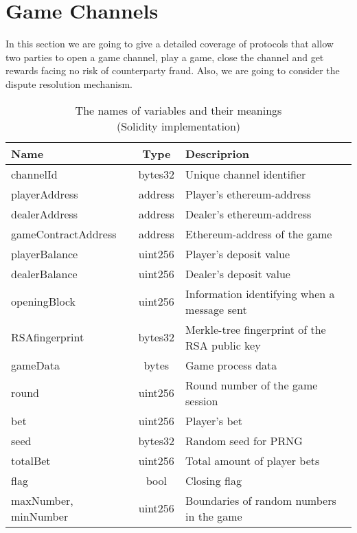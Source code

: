 \section{Game Channels} \label{gamechannel}
In this section we are going to give a detailed coverage of protocols that allow two parties to open a game channel, play a game, close the channel and get rewards facing no risk of counterparty fraud. Also, we are going to consider the dispute resolution mechanism.

\begin{table}[h]

\caption{The names of variables and their meanings \\ (Solidity implementation)}
\begin{tabular}{|l|c|l|}
\hline
Name&Type&Descriprion\\
\hline
channelId & bytes32 & Unique channel identifier\\ 

playerAddress & address & Player's ethereum-address\\            
dealerAddress & address & Dealer's ethereum-address\\  
gameContractAddress & address & Ethereum-address of the game\\             
playerBalance & uint256 & Player's deposit value\\                   
dealerBalance & uint256 & Dealer's deposit value\\                   
openingBlock & uint256 &  Information identifying when a message sent\\                  
RSAfingerprint & bytes32 &  Merkle-tree fingerprint of the RSA public key\\  
gameData & bytes & Game process data\\
round & uint256 & Round number of the game session \\
bet & uint256 & Player's bet \\
seed & bytes32 & Random seed for PRNG\\
totalBet & uint256 & Total amount of  player bets \\
flag & bool &Closing flag \\
maxNumber, minNumber & uint256 & Boundaries of random numbers in the game\\
\hline
\end{tabular}
\end{table}


